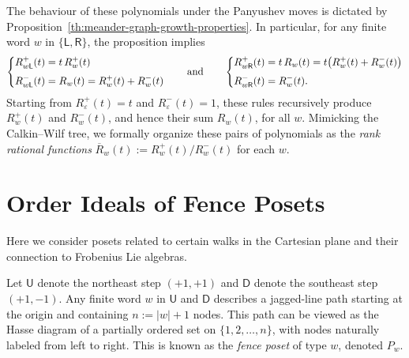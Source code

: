 \documentclass{amsart}
\newcommand{\demph}[1]{\textcolor{myblue}{\emph{#1}}}
\renewcommand{\demph}[1]{\emph{#1}}
\newcommand{\Rfull}[1]{R_{#1}}
\newcommand{\Rtop}[1]{R_{#1}^+}
\newcommand{\Rbot}[1]{R_{#1}^-}
\def\qand{\quad\hbox{and}\quad}
\def\pL{\mathsf L}
\def\pR{\mathsf R}
\def\pU{\mathsf U}
\def\pD{\mathsf D}
\theoremstyle{definition}
\begin{document}
The behaviour of these  polynomials under the Panyushev moves is dictated by Proposition~\ref{th:meander-graph-growth-properties}.  In particular, for any finite word $w$ in $\{\pL,\pR\}$, the proposition implies
\begin{gather}
\label{eq:meander-rankpolynomials}
    \left\{
    \begin{aligned}
        \Rtop{w\pL}(t) &= t\, \Rtop{w}(t) \\[.5ex]
        \Rbot{w\pL}(t) &= \Rfull{w}(t)=\Rtop{w}(t)+\Rbot{w}(t)
    \end{aligned}
    \right.
%
\quad\qand\quad
%
    \left\{
    \begin{aligned}
        \Rtop{w\pR}(t) &= t\,\Rfull{w}(t)=t\big(\Rtop{w}(t)+\Rbot{w}(t)\big) \\[.5ex]
        \Rbot{w\pR}(t) &= \Rbot{w}(t).
    \end{aligned}
    \right.
\end{gather}
Starting from $\Rtop{\varepsilon}(t)=t$ and $\Rbot{\varepsilon}(t)=1$, these rules recursively produce $\Rtop{w}(t)$ and $\Rbot{w}(t)$, and hence their sum $\Rfull{w}(t)$, for all $w$. 
Mimicking the Calkin--Wilf tree, we formally organize these pairs of polynomials as the \demph{rank rational functions} $\overline{R}_w(t):=\Rtop{w}(t)/\Rbot{w}(t)$ for each $w$.
 
\section{Order Ideals of Fence Posets}
\label{sec:fence posets}
Here we consider posets related to certain walks in the Cartesian plane and their connection to Frobenius Lie algebras. 

Let $\pU$ denote the northeast step $(+1,+1)$ and $\pD$ denote the southeast step $(+1,-1)$. Any finite word $w$ in $\pU$ and $\pD$ describes a jagged-line path starting at the origin and containing $n:=|w|+1$ nodes. This path  can be viewed as the Hasse diagram of a partially ordered set on $\{1,2,\ldots,n\}$, with nodes naturally  labeled  from left to right. This is known as the \demph{fence poset} of type $w$, denoted $P_w$. 
\end{document}
